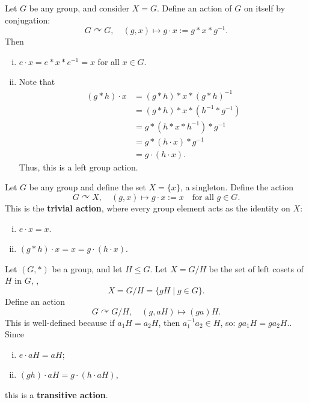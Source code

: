 \documentclass[11pt,openany]{article}
\begin{document}
\newpage
\begin{example*}
Let \( G \) be any group, and consider \( X = G \). Define an action of \( G \) on itself by conjugation: \[
G \curvearrowright G, \quad (g, x) \mapsto g \cdot x := g\ast x\ast g^{-1}.
\] Then \begin{enumerate}[(i)]
	\item \( e \cdot x = e\ast x\ast e^{-1} = x \) for all \( x \in G \).
	\item Note that \begin{align*}
		(g\ast h) \cdot x &= (g\ast h)\ast x\ast (g\ast h)^{-1} \\
		&= (g\ast h)\ast x\ast (h^{-1}\ast g^{-1})\\
		&= g\ast (h\ast x\ast h^{-1})\ast g^{-1}\\
		&= g\ast (h\cdot x)\ast g^{-1}\\
		&=g \cdot (h \cdot x).
	\end{align*} Thus, this is a left group action.
\end{enumerate}
\end{example*}
\begin{example*}
Let \( G \) be any group and define the set \( X = \{x\} \), a singleton. Define the action
\[
G \curvearrowright X, \quad (g,x)\mapsto g \cdot x := x \quad \text{for all } g \in G.
\] This is the \textbf{trivial action}, where every group element acts as the identity on \( X \):
\vfill
\begin{enumerate}[(i)]
	\item \( e \cdot x = x \).
	\item \( (g\ast h) \cdot x = x = g \cdot (h \cdot x) \).
\end{enumerate}
\end{example*}
\vfill
\begin{example*}
Let $(G,\ast)$ be a group, and let \( H \leq G \). Let \( X = G/H \) be the set of left cosets of \( H \) in \( G \), \ie,
\[
X = G/H = \{ gH \mid g \in G \}.
\] Define an action \[
G \curvearrowright G/H, \quad (g, aH) \mapsto (ga)H.
\] This is well-defined because if \( a_1H = a_2H \), then \( a_1^{-1}a_2 \in H \), so: $
g a_1 H = g a_2 H.$. Since \begin{enumerate}[(i)]
	\item \( e \cdot aH = aH \);
	\item \( (gh) \cdot aH = g \cdot (h \cdot aH) \),
\end{enumerate}
this is a \textbf{transitive action}.
\end{example*}
\end{document}
